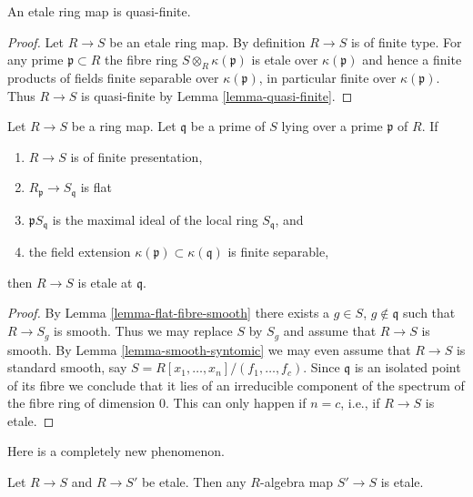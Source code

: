 \begin{lemma}
\label{lemma-etale-quasi-finite}
An etale ring map is quasi-finite.
\end{lemma}

\begin{proof}
Let $R \to S$ be an etale ring map. By definition $R \to S$ is of finite type.
For any prime $\mathfrak p \subset R$ the fibre ring
$S \otimes_R \kappa(\mathfrak p)$ is etale over $\kappa(\mathfrak p)$
and hence a finite products of fields finite separable over
$\kappa(\mathfrak p)$, in particular finite over $\kappa(\mathfrak p)$.
Thus $R \to S$ is quasi-finite by Lemma \ref{lemma-quasi-finite}.
\end{proof}

\begin{lemma}
\label{lemma-characterize-etale}
Let $R \to S$ be a ring map. Let $\mathfrak q$ be a prime of $S$
lying over a prime $\mathfrak p$ of $R$. If
\begin{enumerate}
\item $R \to S$ is of finite presentation,
\item $R_{\mathfrak p} \to S_{\mathfrak q}$ is flat
\item $\mathfrak p S_{\mathfrak q}$ is the maximal ideal
of the local ring $S_{\mathfrak q}$, and
\item the field extension $\kappa(\mathfrak p) \subset \kappa(\mathfrak q)$
is finite separable,
\end{enumerate}
then $R \to S$ is etale at $\mathfrak q$.
\end{lemma}

\begin{proof}
By Lemma \ref{lemma-flat-fibre-smooth}
there exists a $g \in S$, $g \not \in \mathfrak q$
such that $R \to S_g$ is smooth. Thus we may replace $S$ by $S_g$ and
assume that $R \to S$ is smooth. By
Lemma \ref{lemma-smooth-syntomic} we may even assume that
$R \to S$ is standard smooth, say $S = R[x_1, \ldots, x_n]/(f_1, \ldots, f_c)$.
Since $\mathfrak q$ is an isolated point of its fibre we conclude
that it lies of an irreducible component of the spectrum of the
fibre ring of dimension $0$. This can only happen if $n = c$, i.e.,
if $R \to S$ is etale.
\end{proof}

\noindent
Here is a completely new phenomenon.

\begin{lemma}
\label{lemma-map-between-etale}
Let $R \to S$ and $R \to S'$ be etale.
Then any $R$-algebra map $S' \to S$ is etale.
\end{lemma}


